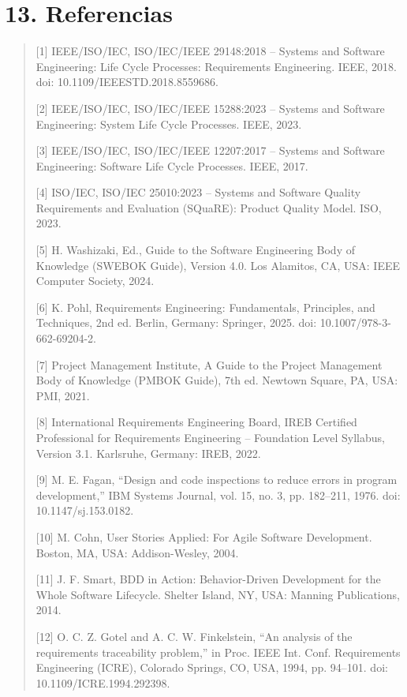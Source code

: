 \documentclass[12pt]{article}
\begin{document}
\section{\texorpdfstring{13. Referencias}{13. Referencias}}\label{referencias}

\begin{quote}
{[}1{]} IEEE/ISO/IEC, ISO/IEC/IEEE 29148:2018 -- Systems and Software Engineering: Life Cycle Processes: Requirements Engineering. IEEE, 2018. doi: 10.1109/IEEESTD.2018.8559686.

{[}2{]} IEEE/ISO/IEC, ISO/IEC/IEEE 15288:2023 -- Systems and Software Engineering: System Life Cycle Processes. IEEE, 2023.

{[}3{]} IEEE/ISO/IEC, ISO/IEC/IEEE 12207:2017 -- Systems and Software Engineering: Software Life Cycle Processes. IEEE, 2017.

{[}4{]} ISO/IEC, ISO/IEC 25010:2023 -- Systems and Software Quality Requirements and Evaluation (SQuaRE): Product Quality Model. ISO, 2023.

{[}5{]} H. Washizaki, Ed., Guide to the Software Engineering Body of Knowledge (SWEBOK Guide), Version 4.0. Los Alamitos, CA, USA: IEEE Computer Society, 2024.

{[}6{]} K. Pohl, Requirements Engineering: Fundamentals, Principles, and Techniques, 2nd ed. Berlin, Germany: Springer, 2025. doi: 10.1007/978-3-662-69204-2.

{[}7{]} Project Management Institute, A Guide to the Project Management Body of Knowledge (PMBOK Guide), 7th ed. Newtown Square, PA, USA: PMI, 2021.

{[}8{]} International Requirements Engineering Board, IREB Certified Professional for Requirements Engineering -- Foundation Level Syllabus, Version 3.1. Karlsruhe, Germany: IREB, 2022.

{[}9{]} M. E. Fagan, ``Design and code inspections to reduce errors in program development,'' IBM Systems Journal, vol. 15, no. 3, pp. 182--211, 1976. doi: 10.1147/sj.153.0182.

{[}10{]} M. Cohn, User Stories Applied: For Agile Software Development. Boston, MA, USA: Addison-Wesley, 2004.

{[}11{]} J. F. Smart, BDD in Action: Behavior-Driven Development for the Whole Software Lifecycle. Shelter Island, NY, USA: Manning Publications, 2014.

{[}12{]} O. C. Z. Gotel and A. C. W. Finkelstein, ``An analysis of the requirements traceability problem,'' in Proc. IEEE Int. Conf. Requirements Engineering (ICRE), Colorado Springs, CO, USA, 1994, pp. 94--101. doi: 10.1109/ICRE.1994.292398.


\end{quote}
\end{document}
